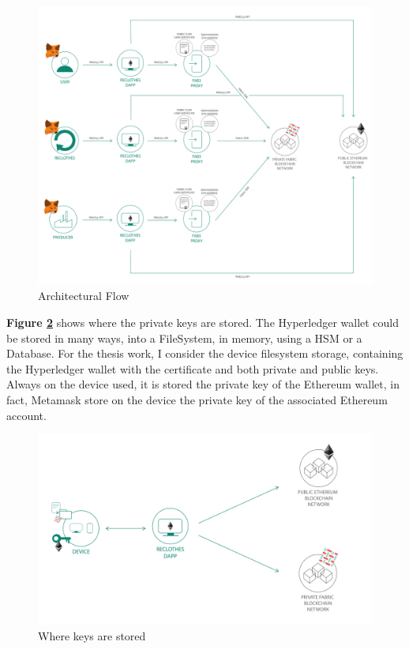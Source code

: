 \begin{figure}[h]
	\centering
	\includegraphics[totalheight=14cm]{img/architectural_flow.png}
	\caption{Architectural Flow}
    \label{fig:architectural-flow}
\end{figure}
\bigskip

\textbf{Figure \ref{fig:keys}} shows where the private keys are stored. The Hyperledger wallet could be stored in many 
ways, into a FileSystem, in memory, using a HSM or a Database\cite{fabric-wallet}. For the thesis work, I consider
the device filesystem storage, containing the Hyperledger wallet with the certificate and both private and public keys.
Always on the device used, it is stored the private key of the Ethereum wallet, in fact, Metamask store on the device
the private key of the associated Ethereum account\cite{metamask}.  
 
\begin{figure}[h]
	\centering
	\includegraphics[totalheight=8cm]{img/keys.png}
	\caption{Where keys are stored}
    \label{fig:keys}
\end{figure}

